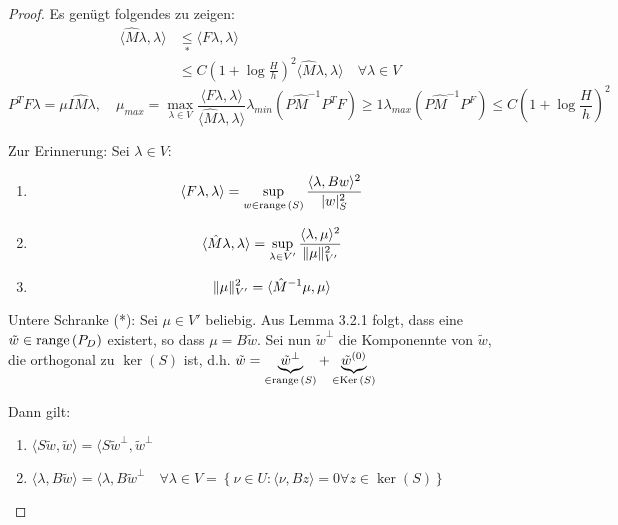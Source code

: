 \begin{proof}
  Es genügt folgendes zu zeigen: 
  \begin{align*}
    \langle \hat{M}\lambda,\lambda\rangle &\underset{*}{\leq} \langle F\lambda,\lambda\rangle\\
    &\leq C(1+\log \frac{H}{h})^2 \langle \hat{M}\lambda,\lambda\rangle \quad \forall \lambda\in V
  \end{align*}
  \[
    P^TF\lambda=\mu I\hat{M}\lambda, \quad 
    \mu_{max} = \max_{\lambda\in V} \frac{\langle F\lambda,\lambda\rangle}{\langle\hat{M}\lambda,\lambda\rangle}
    \lambda_{min}(P\hat{M}^{-1}P^TF) \geq 1
    \lambda_{max}(P\hat{M}^{-1}P^F) \leq C(1+\log \frac{H}{h})^2
  \]

  Zur Erinnerung: Sei $\lambda\in V$:
  \begin{enumerate}
      \item
        \[
          \langle F\lambda,\lambda\rangle = \sup_{w\in\textnormal{range}\,(S)} \frac{\langle\lambda,Bw\rangle^2}{|w|_S^2}
        \]
      \item
        \[
          \langle\hat{M}\lambda,\lambda\rangle = \sup_{\lambda\in V'} \frac{\langle\lambda,\mu\rangle^2}{\|\mu\|_{V'}^2}
        \]
      \item 
        \[
          \|\mu\|_{V'}^2 = \langle\hat{M}^{-1}\mu,\mu\rangle
        \]
  \end{enumerate}

  Untere Schranke (*): 
  Sei $\mu\in V'$ beliebig. Aus Lemma 3.2.1 folgt, dass eine $\tilde{w}\in\textnormal{range}\,(P_D)$ existert, so dass $\mu=B\tilde{w}$. Sei nun $\tilde{w}^{\perp}$ die Komponennte von $\tilde{w}$, die orthogonal zu $\ker(S)$ ist, d.h. $\tilde{w}=\underbrace{\tilde{w}^{\perp}}_{\in\textnormal{range}\,(S)} + \underbrace{\tilde{w}^{(0)}}_{\in\textnormal{Ker}\,(S)}$

  Dann gilt: 
  \begin{enumerate}
    \item $\langle S\tilde{w},\tilde{w}\rangle = \langle S\tilde{w}^{\perp},\tilde{w}^{\perp}$
    \item $\langle\lambda,B\tilde{w}\rangle = \langle\lambda,B\tilde{w}^{\perp} \quad \forall \lambda\in V = \left\{ \nu\in U: \langle\nu,Bz\rangle =0 \forall z\in\ker(S) \right\}$
  \end{enumerate}


\end{proof}
